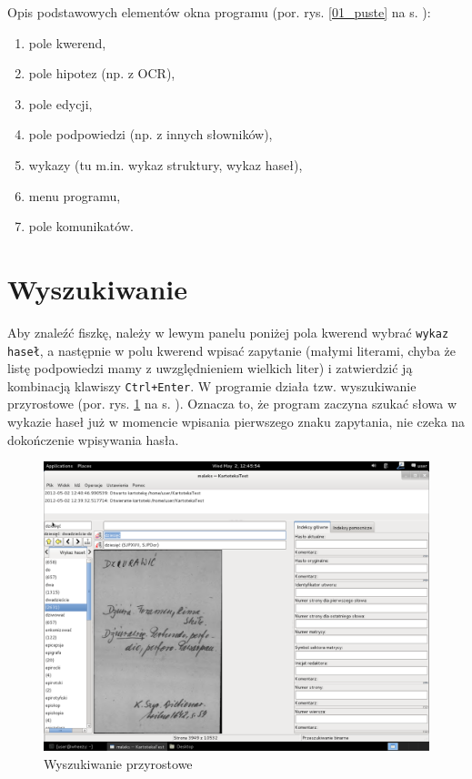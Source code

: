 \documentclass[12pt,oneside,notitlepage,titleauthor]{mwart}%
\begin{document}
Opis podstawowych elementów okna programu (por. rys. \ref{01_puste} na s. \pageref{01_puste}):

\begin{enumerate}
\item pole kwerend,
\item pole hipotez (np. z OCR),
\item pole edycji,
\item pole podpowiedzi (np. z innych słowników),
\item wykazy (tu m.in. wykaz struktury, wykaz haseł),
\item menu programu,
\item pole komunikatów.
\end{enumerate}



\section{Wyszukiwanie}
Aby znaleźć fiszkę, należy w lewym panelu poniżej pola kwerend wybrać \texttt{wykaz haseł}, a następnie w polu kwerend wpisać zapytanie (małymi literami, chyba że listę podpowiedzi mamy z uwzględnieniem wielkich liter) i zatwierdzić ją kombinacją klawiszy \texttt{Ctrl+Enter}. W programie działa tzw. wyszukiwanie przyrostowe (por. rys. \ref{03_wyszukiwanie} na s. \pageref{03_wyszukiwanie}). Oznacza to, że program zaczyna szukać słowa w wykazie haseł już w momencie wpisania pierwszego znaku zapytania, nie czeka na dokończenie wpisywania hasła.  

\begin{figure}[h]
\includegraphics[scale=0.3]{03_wyszukiwanie.png}
\caption{Wyszukiwanie przyrostowe}
\label{03_wyszukiwanie}
\end{figure}
 
\end{document}
